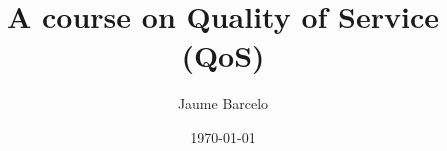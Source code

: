 \documentclass[12pt]{book}
\begin{document}
\frontmatter
\pagestyle{empty}
\title{\textbf{A course on Quality of Service (QoS)}}
\author{Jaume Barcelo}
\date{\today}
\maketitle
%
\pagestyle{fancy}
%
\tableofcontents
%
\mainmatter
%








\begin{appendices}
\appendixpage
\noappendicestocpagenum
\addappheadtotoc


\end{appendices}
\backmatter
%


\end{document}
